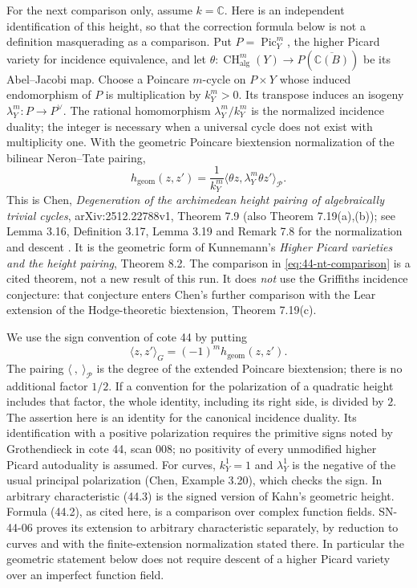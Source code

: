 For the next comparison only, assume $k=\mathbb C$.
Here is an independent identification of this height, so that the
correction formula below is not a definition masquerading as a
comparison.  Put $P=\operatorname{Pic}^{m}_{Y}$, the higher Picard variety
for incidence equivalence, and let
$\theta:\operatorname{CH}^{m}_{\mathrm{alg}}(Y)\to P(\overline{\mathbb C(B)})$
be its Abel--Jacobi map.  Choose a Poincare $m$-cycle on $P\times Y$
whose induced endomorphism of $P$ is multiplication by $k_Y^m>0$.
Its transpose induces an isogeny $\lambda_Y^m:P\to P^\vee$.
The rational homomorphism $\lambda_Y^m/k_Y^m$ is the normalized
incidence duality; the integer is necessary when a universal cycle
does not exist with multiplicity one.  With the geometric Poincare
biextension normalization of the bilinear Neron--Tate pairing,
\[
 h_{\mathrm{geom}}(z,z')
 =\frac{1}{k_Y^m}
    \big\langle\theta z,\lambda_Y^m\theta z'\big\rangle_{\mathcal P}.
 \tag{44.2}\label{eq:44-nt-comparison}
\]
This is Chen, \emph{Degeneration of the archimedean height pairing of
algebraically trivial cycles}, arXiv:2512.22788v1, Theorem 7.9
(also Theorem 7.19(a),(b)); see Lemma 3.16, Definition 3.17,
Lemma 3.19 and Remark 7.8 for the normalization and descent
\cite{ChenHeight2025}.  It is the geometric form of Kunnemann's
\emph{Higher Picard varieties and the height pairing}, Theorem 8.2.
The comparison in \eqref{eq:44-nt-comparison} is a cited theorem, not a
new result of this run.  It does \emph{not} use the Griffiths incidence
conjecture: that conjecture enters Chen's further comparison with the
Lear extension of the Hodge-theoretic biextension, Theorem 7.19(c).

We use the sign convention of cote 44 by putting
\[
 \langle z,z'\rangle_G=(-1)^m h_{\mathrm{geom}}(z,z').
 \tag{44.3}\label{eq:44-signed-height}
\]
The pairing $\langle\ ,\ \rangle_{\mathcal P}$ is the degree of the
extended Poincare biextension; there is no additional factor $1/2$.
If a convention for the polarization of a quadratic height includes
that factor, the whole identity, including its right side, is divided
by $2$.  The assertion here is an identity for the canonical incidence
duality.  Its identification with a positive polarization requires the
primitive signs noted by Grothendieck in cote 44, scan 008; no
positivity of every unmodified higher Picard autoduality is assumed.
For curves, $k_Y^1=1$ and $\lambda_Y^1$ is the negative of the usual
principal polarization (Chen, Example 3.20), which checks the sign.
In arbitrary characteristic (44.3) is the signed version of Kahn's
geometric height.  Formula (44.2), as cited here, is a comparison
over complex function fields.  SN-44-06 proves its extension to
arbitrary characteristic separately, by reduction to curves and
with the finite-extension normalization stated there.  In particular
the geometric statement below does not require descent of a higher
Picard variety over an imperfect function field.

